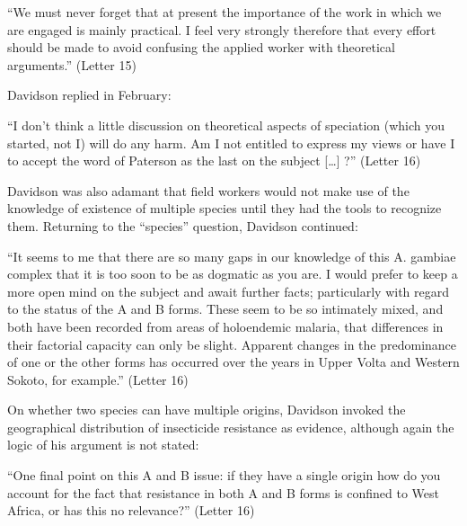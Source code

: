 \documentclass[a4paper,11pt,abstracton,hidelinks]{scrartcl}
\begin{document}
\begin{displayquote}
``We must never forget that at present the importance of the work in which we are engaged is mainly practical. I feel very strongly therefore that every effort should be made to avoid confusing the applied worker with theoretical arguments.'' (Letter 15)
\end{displayquote}


Davidson replied in February:


\begin{displayquote}
``I don't think a little discussion on theoretical aspects of speciation (which you started, not I) will do any harm. Am I not entitled to express my views or have I to accept the word of Paterson as the last on the subject [\ldots] ?'' (Letter 16)
\end{displayquote}


Davidson was also adamant that field workers would not make use of the knowledge of existence of multiple species until they had the tools to recognize them.
%
Returning to the ``species'' question, Davidson continued:


\begin{displayquote}
``It seems to me that there are so many gaps in our knowledge of this A. gambiae complex that it is too soon to be as dogmatic as you are. I would prefer to keep a more open mind on the subject and await further facts; particularly with regard to the status of the A and B forms. These seem to be so intimately mixed, and both have been recorded from areas of holoendemic malaria, that differences in their factorial capacity can only be slight. Apparent changes in the predominance of one or the other forms has occurred over the years in Upper Volta and Western Sokoto, for example.'' (Letter 16)
\end{displayquote}


On whether two species can have multiple origins, Davidson invoked the geographical distribution of insecticide resistance as evidence, although again the logic of his argument is not stated:


\begin{displayquote}
``One final point on this A and B issue: if they have a single origin how do you account for the fact that resistance in both A and B forms is confined to West Africa, or has this no relevance?'' (Letter 16)
\end{displayquote}
\end{document}
